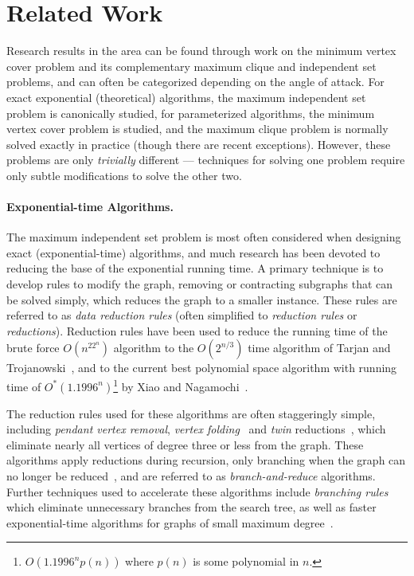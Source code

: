 \documentclass[twoside,leqno,twocolumn]{article}
\begin{document}
\section{Related Work}
\label{sec:related_work}
Research results in the area can be found through work on the minimum vertex cover problem and its complementary maximum clique and independent set problems, and can often be categorized depending on the angle of attack. For exact exponential (theoretical) algorithms, the maximum independent set problem is canonically studied, for parameterized algorithms, the minimum vertex cover problem is studied, and the maximum clique problem is normally solved exactly in practice (though there are recent exceptions). However, these problems are only \emph{trivially} different --- techniques for solving one problem require only subtle modifications to solve the other two.

\paragraph*{Exponential-time Algorithms.}
The maximum independent set problem is most often considered when designing exact (exponential-time) algorithms, and much research has been devoted to reducing the base of the exponential running time. A primary technique is  to develop rules to modify the graph, removing or contracting subgraphs that can be solved simply, which reduces the graph to a smaller instance. These rules are referred to as \emph{data reduction rules} (often simplified to \emph{reduction rules} or \emph{reductions}).
Reduction rules have been used to reduce the running time of the brute force $O(n^22^n)$ algorithm to the $O(2^{n/3})$ time algorithm of Tarjan and Trojanowski~\cite{tarjan-1977}, and to the current best polynomial space algorithm with running time of $O^*(1.1996^n)$\footnote{$O(1.1996^np(n))$ where $p(n)$ is some polynomial in $n$.} by Xiao and Nagamochi~\cite{xiao2017exact}. 

The reduction rules used for these algorithms are often staggeringly simple, including \emph{pendant vertex removal}, \emph{vertex folding}~\cite{chen1999} and \emph{twin} reductions~\cite{Xiao201392}, which eliminate nearly all vertices of degree three or less from the graph. 
These algorithms apply reductions during recursion, only branching when the graph can no longer be reduced~\cite{fomin-2010}, and are referred to as \emph{branch-and-reduce} algorithms. Further techniques used to accelerate these algorithms include \emph{branching rules}~\cite{kneis2009fine,fomin2009measure} which eliminate unnecessary branches from the search tree, as well as faster exponential-time algorithms for graphs of small maximum degree~\cite{xiao2017exact}.
\end{document}
